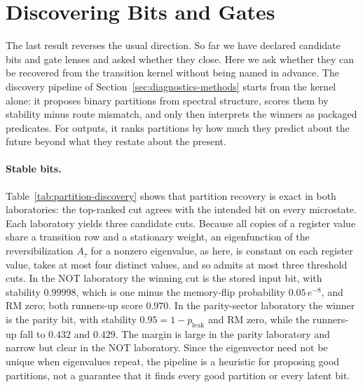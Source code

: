\section{Discovering Bits and Gates}
\label{sec:results-discovery}

The last result reverses the usual direction. So far we have declared candidate bits and gate lenses and asked whether they close. Here we ask whether they can be recovered from the transition kernel without being named in advance. The discovery pipeline of Section~\ref{sec:diagnostics-methods} starts from the kernel alone: it proposes binary partitions from spectral structure, scores them by stability minus route mismatch, and only then interprets the winners as packaged predicates. For outputs, it ranks partitions by how much they predict about the future beyond what they restate about the present.

\begin{table}[t]
    \centering
    \caption{Unsupervised recovery of the stable bit in the NOT laboratory (barrier \(8\), \(p_{\mathrm{gate}}=0.01\)) and the parity-sector laboratory (\(p_{\mathrm{leak}}=0.05\)), both at \(\tau=1\). Agreement is the fraction of microstates on which the top-ranked cut matches the intended bit, up to relabeling. Candidates are the distinct threshold cuts of the spectral eigenfunction. The score is \(S_\tau-\mathrm{RM}\) with stationary weights; the RM of both winners is exactly zero, with frozen floating-point values below \(10^{-16}\).}
    \label{tab:partition-discovery}
    
\end{table}

\paragraph{Stable bits.}
Table~\ref{tab:partition-discovery} shows that partition recovery is exact in both laboratories: the top-ranked cut agrees with the intended bit on every microstate. Each laboratory yields three candidate cuts. Because all copies of a register value share a transition row and a stationary weight, an eigenfunction of the reversibilization \(A_\tau\) for a nonzero eigenvalue, as here, is constant on each register value, takes at most four distinct values, and so admits at most three threshold cuts. In the NOT laboratory the winning cut is the stored input bit, with stability \(0.99998\), which is one minus the memory-flip probability \(0.05\,e^{-8}\), and RM zero; both runners-up score \(0.970\). In the parity-sector laboratory the winner is the parity bit, with stability \(0.95=1-p_{\mathrm{leak}}\) and RM zero, while the runners-up fall to \(0.432\) and \(0.429\). The margin is large in the parity laboratory and narrow but clear in the NOT laboratory. Since the eigenvector need not be unique when eigenvalues repeat, the pipeline is a heuristic for proposing good partitions, not a guarantee that it finds every good partition or every latent bit.

